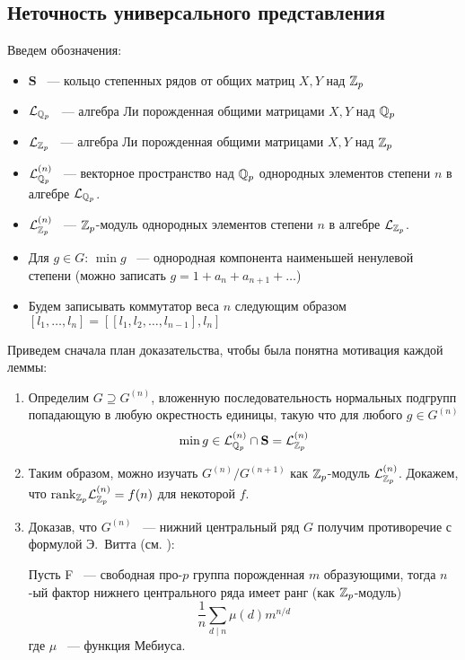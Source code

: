     \subsection{Неточность универсального представления}\label{subsec:zubkov-non-injective}
Введем обозначения:
    \begin{itemize}
        \item $\mathbf{S}$ ~--- кольцо степенных рядов от общих матриц $X, Y$ над $\mathbb{Z}_p$
        \item $\mathcal{L}_{\mathbb{Q}_p}$ ~--- алгебра Ли порожденная общими матрицами $X, Y$ над $\mathbb{Q}_p$
        \item $\mathcal{L}_{\mathbb{Z}_p}$ ~--- алгебра Ли порожденная общими матрицами $X, Y$ над $\mathbb{Z}_p$
        \item $\mathcal{L}_{\mathbb{Q}_p}^{(n)}$ ~--- векторное пространство над $\mathbb{Q}_p$ однородных элементов степени $n$ в алгебре $\mathcal{L}_{\mathbb{Q}_p}$.
        \item $\mathcal{L}_{\mathbb{Z}_p}^{(n)}$ ~---  $\mathbb{Z}_p$-модуль однородных элементов степени $n$ в алгебре $\mathcal{L}_{\mathbb{Z}_p}$.
        \item Для $g\in G$: $\min{g}$ ~--- однородная компонента наименьшей ненулевой степени (можно записать $g=1 + a_n + a_{n+1} + \ldots$)
        \item Будем записывать коммутатор веса $n$ следующим образом $[l_1, \ldots, l_n] = [[l_1, l_2, \ldots, l_{n-1}], l_n]$
    \end{itemize}
    Приведем сначала план доказательства, чтобы была понятна мотивация каждой леммы:
    \begin{enumerate}
        \item Определим $G\supseteq G^{(n)}$, вложенную последовательность нормальных подгрупп попадающую в любую окрестность единицы, такую что для любого $g\in G^{(n)}$
        \[
            \min{g} \in \mathcal{L}^{(n)}_{\mathbb{Q}_p}\cap\mathbf{S} = \mathcal{L}^{(n)}_{\mathbb{Z}_p}
        \]
        \item Таким образом, можно изучать $G^{(n)}/G^{(n+1)}$ как $\mathbb{Z}_p$-модуль $\mathcal{L}^{(n)}_{\mathbb{Z}_p}$.
        Докажем, что $\mathrm{rank}_{\mathbb{Z}_p}{\mathcal{L}^{(n)}_{\mathbb{Z}_p}} = f(n)$ для некоторой $f$.
        \item Доказав, что $G^{(n)}$ ~--- нижний центральный ряд $G$ получим противоречие с формулой Э.\ Витта (см. \cite{Lubotzky}):~\begin{proposition}
            \label{thm:Vitt}
            Пусть F ~--- свободная про-$p$ группа порожденная $m$ образующими, тогда $n$-ый фактор нижнего центрального ряда имеет ранг (как $\mathbb{Z}_p$-модуль)
            \[
                \frac{1}{n}\sum\limits_{d\mid n} \mu(d) m^{n / d}
            \]
            где $\mu$ ~--- функция Мебиуса.
        \end{proposition}
    \end{enumerate}
